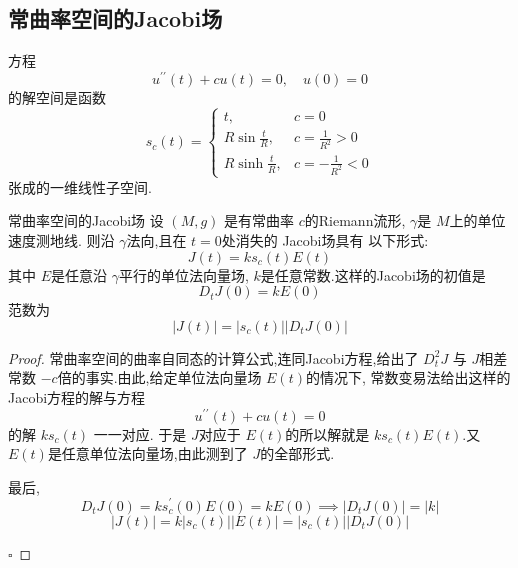 \documentclass[../../几何与拓扑.tex]{subfiles}
\begin{document}
\subsection{常曲率空间的Jacobi场}

\begin{lemma}
    方程 \[
    u^{\prime \prime} \left( t \right)+ c u\left( t \right)= 0,\quad u\left( 0 \right)= 0   
    \]的解空间是函数
    \[
    s_{c}\left( t \right)= \begin{cases} t,&c= 0\\ 
     R\sin \frac{t }{R },& c =  \frac{1 }{R^{2} }> 0\\ 
      R\sinh  \frac{t }{R },&c =-\frac{1 }{R^{2} }< 0     \end{cases}  
    \]张成的一维线性子空间.
\end{lemma}
\begin{proposition}{常曲率空间的Jacobi场}
    设 \(  \left( M,g \right)   \) 是有常曲率 \(  c  \)的Riemann流形, \(   \gamma   \)是 \(  M  \)上的单位速度测地线.   则沿 \(   \gamma   \)法向,且在 \(  t= 0  \)处消失的 Jacobi场具有 以下形式: \[
    J\left( t \right)= k s_{c}\left( t \right)  E\left( t \right) 
    \]其中 \(  E  \)是任意沿 \(   \gamma   \)平行的单位法向量场, \(  k  \)是任意常数.这样的Jacobi场的初值是 \[
    D_{t}J\left( 0 \right)= kE\left( 0 \right)  
    \]范数为 \[
    \left| J\left( t \right)  \right|= \left| s_{c}\left( t \right)  \right|\left| D_{t}J\left( 0 \right)  \right|   
    \]   
\end{proposition}
\begin{proof}
    常曲率空间的曲率自同态的计算公式,连同Jacobi方程,给出了 \(  D_{t}^{2}J  \) 与 \(  J  \)相差常数 \(  -c  \)倍的事实.由此,给定单位法向量场 \(  E\left( t \right)   \)的情况下, 常数变易法给出这样的Jacobi方程的解与方程 \[
    u^{\prime \prime} \left( t \right)+ c u\left( t \right)= 0  
    \]的解 \(  k s_{c}\left( t \right)   \) 一一对应.  于是 \(  J  \)对应于 \(  E\left( t \right)   \)的所以解就是 \(  ks_{c}\left( t \right)E\left( t \right)    \).又 \(  E\left( t \right)   \)是任意单位法向量场,由此测到了 \(  J  \)的全部形式. 

    最后, \[
    D_{t}J\left( 0 \right)= ks_{c}^{\prime} \left( 0 \right)E\left( 0 \right)= kE\left( 0 \right)\implies \left| D_{t}J\left( 0 \right)  \right|= \left| k \right|     
    \]\[
    \left| J\left( t \right)  \right|= k \left| s_{c}\left( t \right)  \right| \left| E\left( t \right)  \right|= \left| s_{c}\left( t \right)  \right|\left| D_{t}J\left( 0 \right)  \right|     
    \]
    
    
    

    \hfill $\square$
\end{proof}
\end{document}

